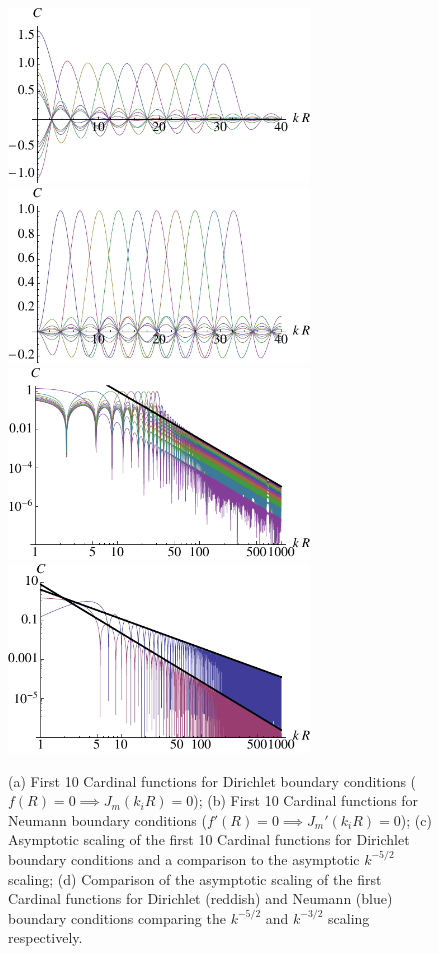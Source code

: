 \documentclass[aip,amsmath,amssymb,reprint,twocolumn]{revtex4-1}
\begin{document}
\begin{figure}
\includegraphics[width=8cm]{First10DirichletCardinalFunctions}
\includegraphics[width=8cm]{First10NeumannCardinalFunctions}
\includegraphics[width=8cm]{First10DirichletCardinalFunctionsScaling}
\includegraphics[width=8cm]{CardinalFunctionDirichletVsNeumannScaling}
\caption{(a) First 10 Cardinal functions for Dirichlet boundary conditions ($f(R) = 0 \implies J_m(k_i R) = 0$); (b) First 10 Cardinal functions for Neumann boundary conditions ($f'(R) = 0 \implies J_m'(k_i R) = 0$); (c) Asymptotic scaling of the first 10 Cardinal functions for Dirichlet boundary conditions and a comparison to the asymptotic $k^{-5/2}$ scaling; (d) Comparison of the asymptotic scaling of the first Cardinal functions for Dirichlet (reddish) and Neumann (blue) boundary conditions comparing the $k^{-5/2}$ and $k^{-3/2}$ scaling respectively.\label{fig:CardinalFunctions}}
\end{figure}
\end{document}
